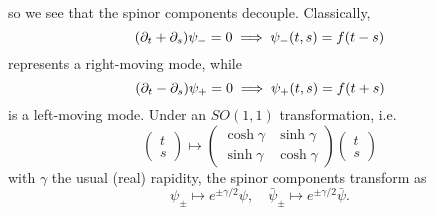 so we see that the spinor components decouple. Classically,
\begin{equation}
    (\partial_t + \partial_s)\psi_-=0\implies \psi_-(t,s)=f(t-s)
\end{equation}
represents a right-moving mode, while
\begin{equation}
    (\partial_t - \partial_s)\psi_+=0\implies \psi_+(t,s)=f(t+s)
\end{equation}
is a left-moving mode. Under an $SO(1,1)$ transformation, i.e.
\begin{equation}
    \begin{pmatrix}t\\ s\end{pmatrix} \mapsto
    \begin{pmatrix}
    \cosh\gamma & \sinh\gamma\\
    \sinh\gamma & \cosh\gamma
    \end{pmatrix}
    \begin{pmatrix}t\\ s\end{pmatrix}
\end{equation}
with $\gamma$ the usual (real) rapidity, the spinor components transform as
\begin{equation}
    \psi_\pm \mapsto e^{\pm \gamma/2}\psi,\quad \bar\psi_\pm \mapsto e^{\pm \gamma/2}\bar\psi.
\end{equation}